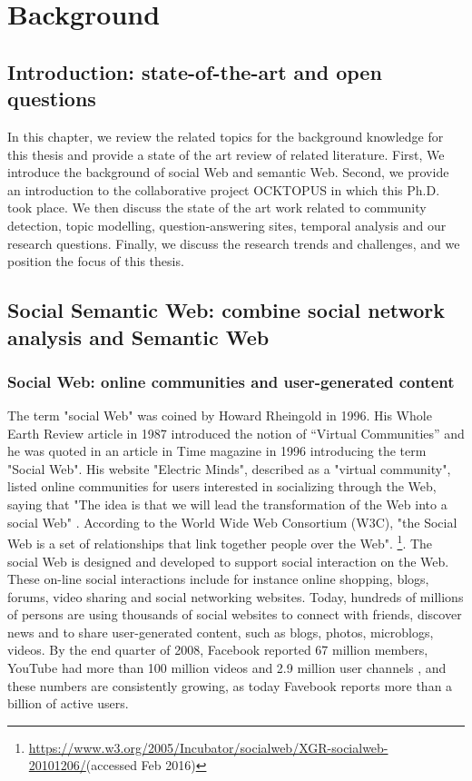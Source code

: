 \chapter{Background}
\doublespacing
\label{chap:background}
\minitoc

\section{Introduction: state-of-the-art and open questions}
In this chapter, we review the related topics for the background knowledge for this thesis and provide a state of the art review of related literature. First, We introduce the background of social Web and semantic Web.
Second, we provide an introduction to the collaborative project OCKTOPUS in which this Ph.D. took place.
We then discuss the state of the art work related to community detection, topic modelling, question-answering sites, temporal analysis and our research questions.
Finally, we discuss the research trends and challenges, and we position the focus of this thesis.

\section{Social Semantic Web: combine social network analysis and Semantic Web}

\subsection{Social Web: online communities and user-generated content}
The term "social Web" was coined by Howard Rheingold in 1996. His Whole Earth Review article in 1987 introduced the notion of “Virtual Communities” and he was quoted in an article in Time magazine in 1996 introducing the term "Social Web". His website "Electric Minds", described as a "virtual community", listed online communities for users interested in socializing through the Web, saying that "The idea is that we will lead the transformation of the Web into a social Web" \cite{rheingold2000virtual}. According to the World Wide Web Consortium (W3C), "the Social Web is a set of relationships that link together people over the Web". \footnote{\url{https://www.w3.org/2005/Incubator/socialweb/XGR-socialweb-20101206/}(accessed Feb 2016)}. The social Web is designed and developed to support social interaction \cite{porter2010designing} on the Web. These on-line social interactions include for instance online shopping, blogs, forums, video sharing and social networking websites. Today, hundreds of millions of persons are using thousands of social websites to connect with friends, discover news and to share user-generated content, such as blogs, photos, microblogs, videos. By the end quarter of 2008, Facebook reported 67 million members, YouTube had more than 100 million videos and 2.9 million user channels \cite{watson2008causewired}, and these numbers are consistently growing, as today Favebook reports more than a billion of active users.  


